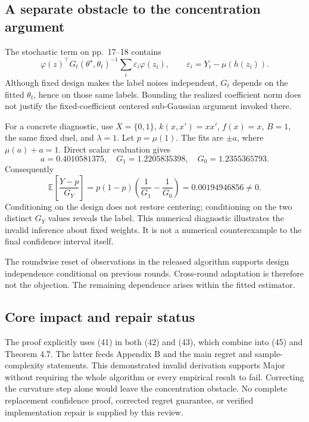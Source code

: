 \documentclass[10pt]{article}
\begin{document}
\subsection*{A separate obstacle to the concentration argument}
The stochastic term on pp. 17–18 contains \[\varphi(z)^\top G_t(\theta^\star,\theta_t)^{-1}
\sum_i\varepsilon_i\varphi(z_i),\qquad
\varepsilon_i=Y_i-\mu(h(z_i)).\] Although fixed design makes the label noises independent, \(G_t\) depends on the fitted \(\theta_t\), hence on those same labels. Bounding the realized coefficient norm does not justify the fixed-coefficient centered sub-Gaussian argument invoked there.\par
For a concrete diagnostic, use \(X=\{0,1\}\), \(k(x,x')=xx'\), \(f(x)=x\), \(B=1\), the same fixed duel, and \(\lambda=1\). Let \(p=\mu(1)\). The fits are \(\pm a\), where \(\mu(a)+a=1\). Direct scalar evaluation gives \[a=0.4010581375,\quad G_1=1.2205835398,\quad G_0=1.2355365793.\] Consequently \[\mathbb E\!\left[\frac{Y-p}{G_Y}\right]
=p(1-p)\left(\frac1{G_1}-\frac1{G_0}\right)
=0.00194946856\ne0 .\] Conditioning on the design does not restore centering; conditioning on the two distinct \(G_Y\) values reveals the label. This numerical diagnostic illustrates the invalid inference about fixed weights. It is not a numerical counterexample to the final confidence interval itself.\par
The roundwise reset of observations in the released algorithm supports design independence conditional on previous rounds. Cross-round adaptation is therefore not the objection. The remaining dependence arises within the fitted estimator.\par
\subsection*{Core impact and repair status}
The proof explicitly uses (41) in both (42) and (43), which combine into (45) and Theorem 4.7. The latter feeds Appendix B and the main regret and sample-complexity statements. This demonstrated invalid derivation supports Major without requiring the whole algorithm or every empirical result to fail. Correcting the curvature step alone would leave the concentration obstacle. No complete replacement confidence proof, corrected regret guarantee, or verified implementation repair is supplied by this review.\par
\end{document}
